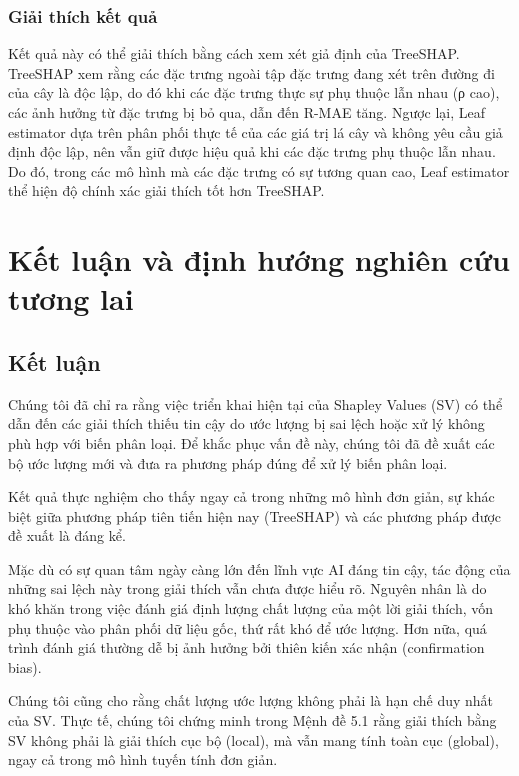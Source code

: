 \documentclass[12pt, a4paper]{article}
\begin{document}
\subsubsection{Giải thích kết quả}
\begin{adjustwidth}{2.0em}{0cm}

Kết quả này có thể giải thích bằng cách xem xét giả định của TreeSHAP. TreeSHAP xem rằng các đặc trưng ngoài tập đặc trưng đang xét trên đường đi của cây là độc lập, do đó khi các đặc trưng thực sự phụ thuộc lẫn nhau (ρ cao), các ảnh hưởng từ đặc trưng bị bỏ qua, dẫn đến R-MAE tăng. Ngược lại, Leaf estimator dựa trên phân phối thực tế của các giá trị lá cây và không yêu cầu giả định độc lập, nên vẫn giữ được hiệu quả khi các đặc trưng phụ thuộc lẫn nhau. Do đó, trong các mô hình mà các đặc trưng có sự tương quan cao, Leaf estimator thể hiện độ chính xác giải thích tốt hơn TreeSHAP.
\end{adjustwidth}




\section{Kết luận và định hướng nghiên cứu tương lai}

\subsection{Kết luận}

Chúng tôi đã chỉ ra rằng việc triển khai hiện tại của Shapley Values (SV) có thể dẫn đến các giải thích thiếu tin cậy do ước lượng bị sai lệch hoặc xử lý không phù hợp với biến phân loại. Để khắc phục vấn đề này, chúng tôi đã đề xuất các bộ ước lượng mới và đưa ra phương pháp đúng để xử lý biến phân loại. 

Kết quả thực nghiệm cho thấy ngay cả trong những mô hình đơn giản, sự khác biệt giữa phương pháp tiên tiến hiện nay (TreeSHAP) và các phương pháp được đề xuất là đáng kể.

Mặc dù có sự quan tâm ngày càng lớn đến lĩnh vực AI đáng tin cậy, tác động của những sai lệch này trong giải thích vẫn chưa được hiểu rõ. Nguyên nhân là do khó khăn trong việc đánh giá định lượng chất lượng của một lời giải thích, vốn phụ thuộc vào phân phối dữ liệu gốc, thứ rất khó để ước lượng. Hơn nữa, quá trình đánh giá thường dễ bị ảnh hưởng bởi thiên kiến xác nhận (confirmation bias).

Chúng tôi cũng cho rằng chất lượng ước lượng không phải là hạn chế duy nhất của SV. Thực tế, chúng tôi chứng minh trong Mệnh đề 5.1 rằng giải thích bằng SV không phải là giải thích cục bộ (local), mà vẫn mang tính toàn cục (global), ngay cả trong mô hình tuyến tính đơn giản.
\end{document}
